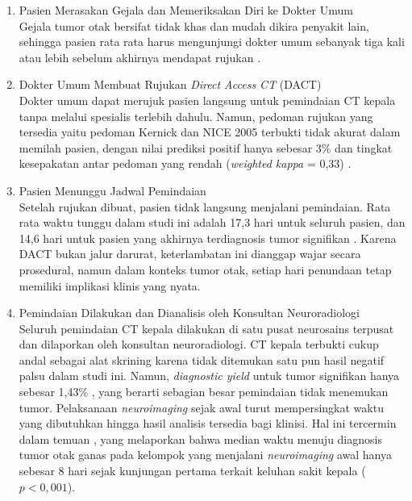 \begin{enumerate}
	\item Pasien Merasakan Gejala dan Memeriksakan Diri ke Dokter Umum\\
	Gejala tumor otak bersifat tidak khas dan mudah dikira penyakit lain, sehingga pasien rata rata harus mengunjungi dokter umum sebanyak tiga kali atau lebih sebelum akhirnya mendapat rujukan \cite{zienius2019direct}.
	
	\item Dokter Umum Membuat Rujukan \textit{Direct Access CT} (DACT)\\
	Dokter umum dapat merujuk pasien langsung untuk pemindaian CT kepala tanpa melalui spesialis terlebih dahulu. Namun, pedoman rujukan yang tersedia yaitu pedoman Kernick dan NICE 2005 terbukti tidak akurat dalam memilah pasien, dengan nilai prediksi positif hanya sebesar 3\% dan tingkat kesepakatan antar pedoman yang rendah (\textit{weighted kappa} = 0,33) \cite{zienius2019direct}.
	
	\item Pasien Menunggu Jadwal Pemindaian\\
	Setelah rujukan dibuat, pasien tidak langsung menjalani pemindaian. Rata rata waktu tunggu dalam studi ini adalah 17,3 hari untuk seluruh pasien, dan 14,6 hari untuk pasien yang akhirnya terdiagnosis tumor signifikan \cite{zienius2019direct}. Karena DACT bukan jalur darurat, keterlambatan ini dianggap wajar secara prosedural, namun dalam konteks tumor otak, setiap hari penundaan tetap memiliki implikasi klinis yang nyata.
	
	\item Pemindaian Dilakukan dan Dianalisis oleh Konsultan Neuroradiologi\\
	Seluruh pemindaian CT kepala dilakukan di satu pusat neurosains terpusat dan dilaporkan oleh konsultan neuroradiologi. CT kepala terbukti cukup andal sebagai alat skrining karena tidak ditemukan satu pun hasil negatif palsu dalam studi ini. Namun, \textit{diagnostic yield} untuk tumor signifikan hanya sebesar 1,43\% \cite{zienius2019direct}, yang berarti sebagian besar pemindaian tidak menemukan tumor. Pelaksanaan \textit{neuroimaging} sejak awal turut mempersingkat waktu yang dibutuhkan hingga hasil analisis tersedia bagi klinisi. Hal ini tercermin dalam temuan \textcite{carey2019impact}, yang melaporkan bahwa median waktu menuju diagnosis tumor otak ganas pada kelompok yang menjalani \textit{neuroimaging} awal hanya sebesar 8 hari sejak kunjungan pertama terkait keluhan sakit kepala ($p < 0{,}001$).
	

\end{enumerate}
